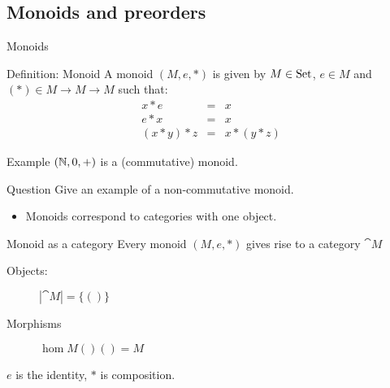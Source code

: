 \documentclass[handout]{beamer}
\begin{document}
\subsection{Monoids and preorders}

\begin{frame}{Monoids}

  \begin{block}{Definition: Monoid}
    A monoid $(M,e,*)$ is given by $M\in\mathrm{Set}$, $e\in M$ and 
    $(*) \in M \to M \to M$ such that:
    \begin{eqnarray*}
      x * e & = & x\\
      e * x & = & x\\
      (x * y) * z & = & x * (y * z)
    \end{eqnarray*}
  \end{block}

  \pause
  \begin{block}{Example}
    $(\mathbb{N},0,+)$ is a (commutative) monoid.
  \end{block}
 
  \pause
  \begin{block}{Question}
    Give an example of a non-commutative monoid.
  \end{block}

\end{frame}

\begin{frame}

  \begin{itemize}
  \item Monoids correspond to categories with one object.
  \end{itemize}

  \pause
  \begin{block}{Monoid as a category}
    Every monoid $(M,e,*)$ gives rise to a category $\cat{M}$
    \begin{description}
    \item[Objects:] $|\cat{M}| = \{ () \}$

    \item[Morphisms] $\hom{M}{()}{()} = M$
    \end{description}
    $e$ is the identity, $*$ is composition.
  \end{block}
\end{frame}
\end{document}
